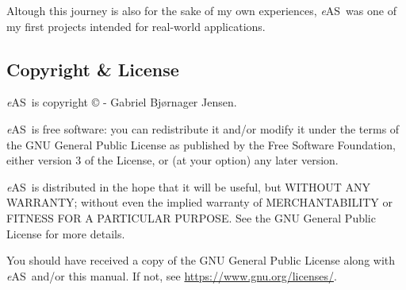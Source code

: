 \documentclass[a4paper]{article}
\newcommand*{\eAS}{\textup{\textit{e}AS}}
\begin{document}
			Altough this journey is also for the sake of my own experiences, \eAS\ was one of my first projects intended for real-world applications.

		\subsection{Copyright \& License}
			\label{sec:copyright_and_license}
			\eAS\ is copyright © - Gabriel Bjørnager Jensen.

			\eAS\ is free software: you can redistribute it and/or modify it under the terms of the GNU General Public License as published by the Free Software Foundation, either version 3 of the License, or (at your option) any later version.

			\eAS\ is distributed in the hope that it will be useful, but WITHOUT ANY WARRANTY; without even the implied warranty of MERCHANTABILITY or FITNESS FOR A PARTICULAR PURPOSE.
			See the GNU General Public License for more details.

			You should have received a copy of the GNU General Public License along with \eAS\ and/or this manual.
			If not, see \url{https://www.gnu.org/licenses/}.

	\clearpage
\end{document}
